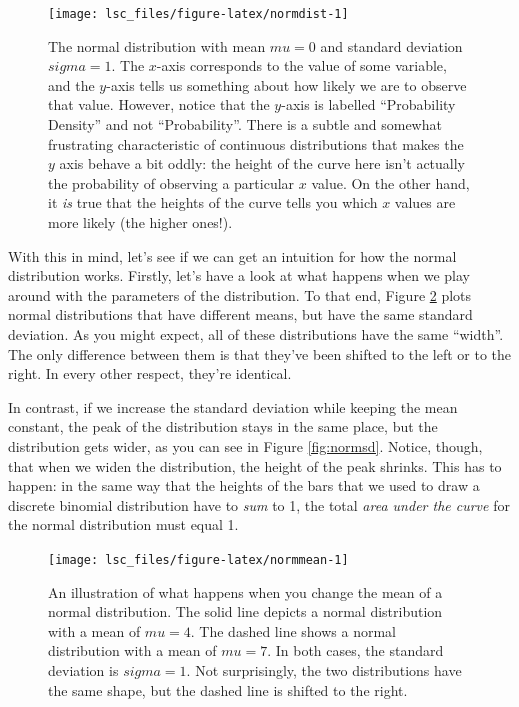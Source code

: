 \documentclass[
  11pt,
  a4paper,
  twoside,symmetric,openright]{book}
\theoremstyle{break}
\theoremstyle{break}
\begin{document}
\begin{figure}

{\centering \texttt{[image: lsc\_files/figure-latex/normdist-1]} 

}

\caption{The normal distribution with mean \(mu = 0\) and standard deviation \(sigma = 1\). The \(x\)-axis corresponds to the value of some variable, and the \(y\)-axis tells us something about how likely we are to observe that value. However, notice that the \(y\)-axis is labelled ``Probability Density'' and not ``Probability''. There is a subtle and somewhat frustrating characteristic of continuous distributions that makes the \(y\) axis behave a bit oddly: the height of the curve here isn't actually the probability of observing a particular \(x\) value. On the other hand, it \emph{is} true that the heights of the curve tells you which \(x\) values are more likely (the higher ones!).}\label{fig:normdist}
\end{figure}

With this in mind, let's see if we can get an intuition for how the normal distribution works. Firstly, let's have a look at what happens when we play around with the parameters of the distribution. To that end, Figure \ref{fig:normmean} plots normal distributions that have different means, but have the same standard deviation. As you might expect, all of these distributions have the same ``width''. The only difference between them is that they've been shifted to the left or to the right. In every other respect, they're identical.

In contrast, if we increase the standard deviation while keeping the mean constant, the peak of the distribution stays in the same place, but the distribution gets wider, as you can see in Figure \ref{fig:normsd}. Notice, though, that when we widen the distribution, the height of the peak shrinks. This has to happen: in the same way that the heights of the bars that we used to draw a discrete binomial distribution have to \emph{sum} to 1, the total \emph{area under the curve} for the normal distribution must equal 1.

\begin{figure}

{\centering \texttt{[image: lsc\_files/figure-latex/normmean-1]} 

}

\caption{An illustration of what happens when you change the mean of a normal distribution. The solid line depicts a normal distribution with a mean of $mu=4$. The dashed line shows a normal distribution with a mean of $mu=7$. In both cases, the standard deviation is $sigma=1$. Not surprisingly, the two distributions have the same shape, but the dashed line is shifted to the right.}\label{fig:normmean}
\end{figure}
\end{document}
